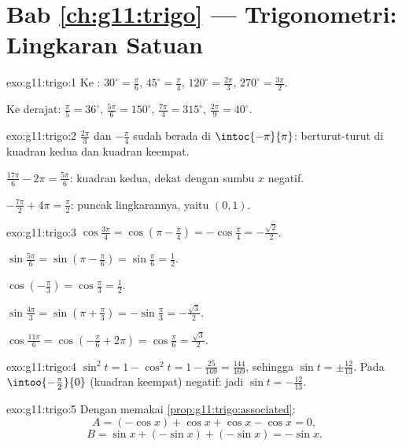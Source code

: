 \section*{Bab \ref{ch:g11:trigo} --- Trigonometri: Lingkaran Satuan}

\begin{solution}{exo:g11:trigo:1}
Ke : $30^\circ = \frac{\pi}{6}$, $45^\circ = \frac{\pi}{4}$,
$120^\circ = \frac{2\pi}{3}$, $270^\circ = \frac{3\pi}{2}$.

Ke derajat: $\frac{\pi}{5} = 36^\circ$, $\frac{5\pi}{6} = 150^\circ$,
$\frac{7\pi}{4} = 315^\circ$, $\frac{2\pi}{9} = 40^\circ$.
\end{solution}

\begin{solution}{exo:g11:trigo:2}
$\frac{2\pi}{3}$ dan $-\frac{\pi}{4}$ sudah berada di
$\intoc{-\pi}{\pi}$: berturut-turut di kuadran kedua dan kuadran keempat.

$\frac{17\pi}{6} - 2\pi = \frac{5\pi}{6}$: kuadran kedua, dekat dengan
sumbu $x$ negatif.

$-\frac{7\pi}{2} + 4\pi = \frac{\pi}{2}$: puncak lingkarannya, yaitu
$(0, 1)$.
\end{solution}

\begin{solution}{exo:g11:trigo:3}
$\cos\frac{3\pi}{4} = \cos\left(\pi - \frac\pi4\right)
= -\cos\frac\pi4 = -\frac{\sqrt2}{2}$.

$\sin\frac{5\pi}{6} = \sin\left(\pi - \frac\pi6\right)
= \sin\frac\pi6 = \frac12$.

$\cos\left(-\frac\pi3\right) = \cos\frac\pi3 = \frac12$.

$\sin\frac{4\pi}{3} = \sin\left(\pi + \frac\pi3\right)
= -\sin\frac\pi3 = -\frac{\sqrt3}{2}$.

$\cos\frac{11\pi}{6} = \cos\left(-\frac\pi6 + 2\pi\right)
= \cos\frac\pi6 = \frac{\sqrt3}{2}$.
\end{solution}

\begin{solution}{exo:g11:trigo:4}
$\sin^2 t = 1 - \cos^2 t = 1 - \frac{25}{169} = \frac{144}{169}$, sehingga
$\sin t = \pm\frac{12}{13}$. Pada $\intoo{-\frac\pi2}{0}$ (kuadran keempat)
 negatif: jadi $\sin t = -\frac{12}{13}$.
\end{solution}

\begin{solution}{exo:g11:trigo:5}
Dengan memakai \cref{prop:g11:trigo:associated}:
\[
A = (-\cos x) + \cos x + \cos x - \cos x = 0 ,
\]
\[
B = \sin x + (-\sin x) + (-\sin x) = -\sin x .
\]
\end{solution}


